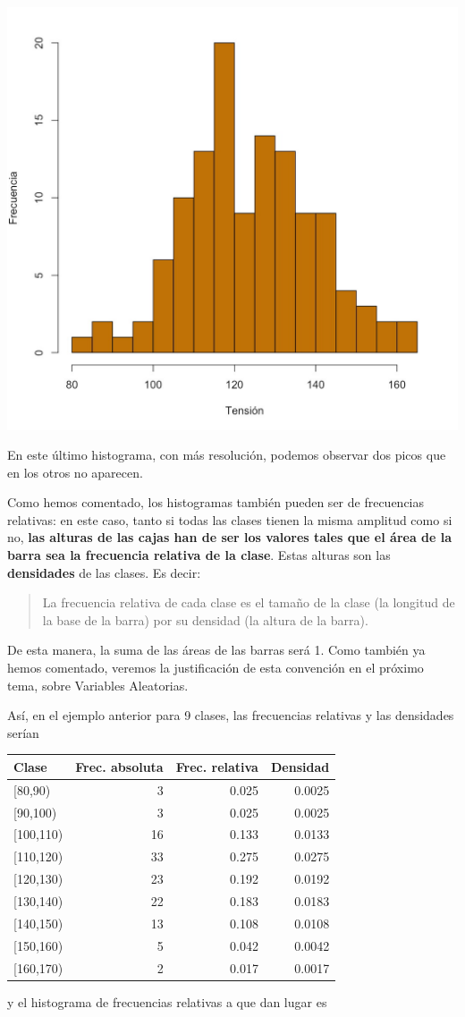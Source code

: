 \documentclass[
]{book}
\theoremstyle{definition}
\theoremstyle{definition}
\theoremstyle{definition}
\theoremstyle{definition}
\theoremstyle{remark}
\begin{document}
\begin{center}\includegraphics[width=0.6\linewidth]{INREMDN_files/figure-html/tensio4} \end{center}

En este último histograma, con más resolución, podemos observar dos picos que en los otros no aparecen.

Como hemos comentado, los histogramas también pueden ser de frecuencias relativas: en este caso, tanto si todas las clases tienen la misma amplitud como si no, \textbf{las alturas de las cajas han de ser los valores tales que el área de la barra sea la frecuencia relativa de la clase}. Estas alturas son las \textbf{densidades} de las clases. Es decir:

\begin{quote}
La frecuencia relativa de cada clase es el tamaño de la clase (la longitud de la base de la barra) por su densidad (la altura de la barra).
\end{quote}

De esta manera, la suma de las áreas de las barras será 1. Como también ya hemos comentado, veremos la justificación de esta convención en el próximo tema, sobre Variables Aleatorias.

Así, en el ejemplo anterior para 9 clases, las frecuencias relativas y las densidades serían

\begin{table}
\centering
\begin{tabular}{l|r|r|r}
\hline
Clase & Frec. absoluta & Frec. relativa & Densidad\\
\hline
[80,90) & 3 & 0.025 & 0.0025\\
\hline
[90,100) & 3 & 0.025 & 0.0025\\
\hline
[100,110) & 16 & 0.133 & 0.0133\\
\hline
[110,120) & 33 & 0.275 & 0.0275\\
\hline
[120,130) & 23 & 0.192 & 0.0192\\
\hline
[130,140) & 22 & 0.183 & 0.0183\\
\hline
[140,150) & 13 & 0.108 & 0.0108\\
\hline
[150,160) & 5 & 0.042 & 0.0042\\
\hline
[160,170) & 2 & 0.017 & 0.0017\\
\hline
\end{tabular}
\end{table}
y el histograma de frecuencias relativas a que dan lugar es
\end{document}
